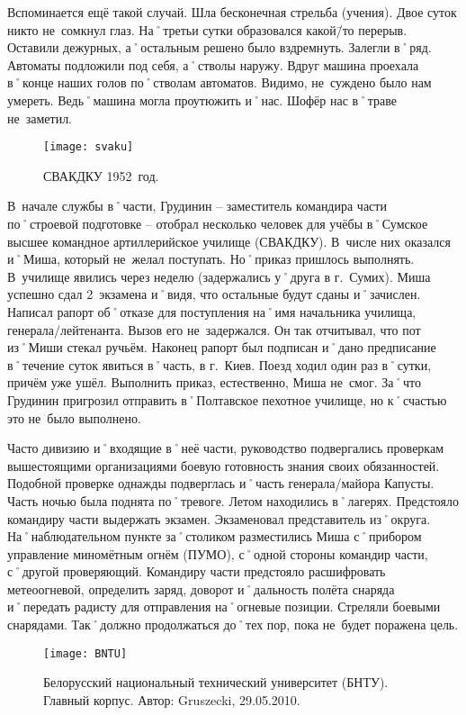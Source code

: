 Вспоминается ещё такой случай. Шла бесконечная стрельба (учения). Двое суток никто не~сомкнул глаз. На˚третьи сутки образовался какой\=/то перерыв. Оставили дежурных, а˚остальным решено было вздремнуть. Залегли в˚ряд. Автоматы подложили под себя, а˚стволы наружу. Вдруг машина проехала в˚конце наших голов по˚стволам автоматов. Видимо, не~суждено было нам умереть. Ведь˚машина могла проутюжить и˚нас. Шофёр нас в˚траве не~заметил.

\begin{wrapfigure}{O}{.4\textwidth}
\centering
\texttt{[image: svaku]}
\caption[СВАКДКУ 1952~год.]{СВАКДКУ 1952~год\footnotemark.}
\label{fig:svaku}
\end{wrapfigure}

В~начале службы в˚части, Грудинин \--- заместитель командира части по˚строевой подготовке \--- отобрал несколько человек для учёбы в˚Сумское высшее командное артиллерийское училище (СВАКДКУ). В~числе них оказался и˚Миша, который не~желал поступать. Но˚приказ пришлось выполнять. В~училище явились через неделю (задержались у˚друга в г.~Сумих). Миша успешно сдал 2~экзамена и˚видя, что остальные будут сданы и˚зачислен. Написал рапорт об˚отказе для поступления на˚имя начальника училища, генерала\-/лейтенанта. Вызов его не~задержался. Он так отчитывал, что пот из˚Миши стекал ручьём. Наконец рапорт был подписан и˚дано предписание в˚течение суток явиться в˚часть, в г.~Киев. Поезд ходил один раз в˚сутки, причём уже ушёл. Выполнить приказ, естественно, Миша не~смог. За˚что Грудинин пригрозил отправить в˚Полтавское пехотное училище, но к˚счастью это не~было выполнено. 

Часто дивизию и˚входящие в˚неё части, руководство подвергались проверкам вышестоящими организациями боевую готовность знания своих обязанностей. Подобной проверке однажды подверглась и˚часть генерала\-/майора Капусты. Часть ночью была поднята по˚тревоге. Летом находились в˚лагерях. Предстояло командиру части выдержать экзамен. Экзаменовал представитель из˚округа. На˚наблюдательном пункте за˚столиком разместились Миша с˚прибором управление миномётным огнём (ПУМО), с˚одной стороны командир части, с˚другой проверяющий. Командиру части предстояло расшифровать метеоогневой, определить заряд, доворот и˚дальность полёта снаряда и˚передать радисту для отправления на˚огневые позиции. Стреляли боевыми снарядами. Так˚должно продолжаться до˚тех пор, пока не~будет поражена цель. 

\begin{wrapfigure}{O}{.4\textwidth}
\centering
\texttt{[image: BNTU]}
\caption{Белорусский национальный технический университет (БНТУ). Главный корпус. Автор: Gruszecki, 29.05.2010.}
\label{fig:BNTU}
\end{wrapfigure}

